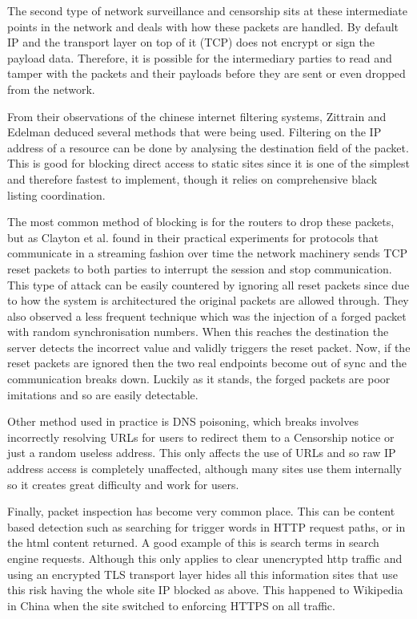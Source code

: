 \documentclass[10pt,a4paper]{article}
\begin{document}
The second type of network surveillance and censorship sits at these intermediate points in the network and deals with how these packets are handled. By default IP and the transport layer on top of it (TCP) does not encrypt or sign the payload data. Therefore, it is possible for the intermediary parties to read and tamper with the packets and their payloads before they are sent or even dropped from the network. 

From their observations of the chinese internet filtering systems, Zittrain and Edelman\cite{edelman2005empirical} deduced several methods that were being used. Filtering on the IP address of a resource can be done by analysing the destination field of the packet. This is good for blocking direct access to static sites since it  is one of the simplest and therefore fastest to implement, though it relies on comprehensive black listing coordination.

The most common method of blocking is for the routers to drop these packets, but as Clayton et al. found in their practical experiments\cite{clayton2006ignoring} for protocols that communicate in a streaming fashion over time the network machinery sends TCP reset packets to both parties to interrupt the session and stop communication. This type of attack can be easily countered by ignoring all reset packets since due to how the system is architectured the original packets are allowed through. They also observed a less frequent technique which was the injection of a forged packet with random synchronisation numbers. When this reaches the destination the server detects the incorrect value and validly triggers the reset packet. Now, if the reset packets are ignored then the two real endpoints become out of sync and the communication breaks down. Luckily as it stands, the forged packets are poor imitations and so are easily detectable.

Other method used in practice is DNS poisoning, which breaks involves incorrectly resolving URLs for users to redirect them to a Censorship notice or just a random useless address. This only affects the use of URLs and so raw IP address access is completely unaffected, although many sites use them internally so it creates great difficulty and work for users.

Finally, packet inspection has become very common place. This can be content based detection such as searching for trigger words in HTTP request paths, or in the html content returned. A good example of this is search terms in search engine requests. Although this only applies to clear unencrypted http traffic and using an encrypted  TLS transport layer hides all this information sites that use this risk having the whole site IP blocked as above. This happened to Wikipedia in China when the site switched to enforcing HTTPS on all traffic.
\end{document}
